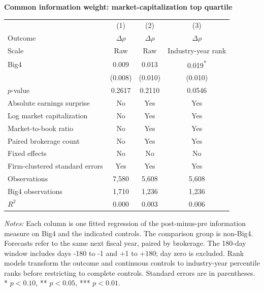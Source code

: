 \documentclass[10pt]{article}
\newcommand{\sym}[1]{\textsuperscript{#1}}
\begin{document}
\begin{minipage}{18.0cm}
\fontsize{10}{12}\selectfont
\setlength{\tabcolsep}{4pt}\renewcommand{\arraystretch}{1.12}
{\large\bfseries Common information weight: market-capitalization top quartile}\par\medskip
\begin{tabular*}{\linewidth}{@{\extracolsep{\fill}}lccc@{}}
\toprule
 & (1) & (2) & (3) \\
Outcome & $\Delta\rho$ & $\Delta\rho$ & $\Delta\rho$ \\
Scale & Raw & Raw & Industry-year rank \\
\midrule
Big4 & 0.009 & 0.013 & 0.019\sym{*} \\
 & (0.008) & (0.010) & (0.010) \\
$p$-value & 0.2617 & 0.2110 & 0.0546 \\
\midrule
Absolute earnings surprise & No & Yes & Yes \\
Log market capitalization & No & Yes & Yes \\
Market-to-book ratio & No & Yes & Yes \\
Paired brokerage count & No & Yes & Yes \\
Fixed effects & No & No & No \\
Firm-clustered standard errors & Yes & Yes & Yes \\
Observations & 7,580 & 5,608 & 5,608 \\
Big4 observations & 1,710 & 1,236 & 1,236 \\
$R^2$ & 0.000 & 0.003 & 0.006 \\
\bottomrule\end{tabular*}\par\medskip
\fontsize{9}{11}\selectfont\textit{Notes:} Each column is one fitted regression of the post-minus-pre information measure on Big4 and the indicated controls. The comparison group is non-Big4. Forecasts refer to the same next fiscal year, paired by brokerage. The 180-day window includes days -180 to -1 and +1 to +180; day zero is excluded. Rank models transform the outcome and continuous controls to industry-year percentile ranks before restricting to complete controls. Standard errors are in parentheses. * $p<0.10$, ** $p<0.05$, *** $p<0.01$.
\end{minipage}
\end{document}
